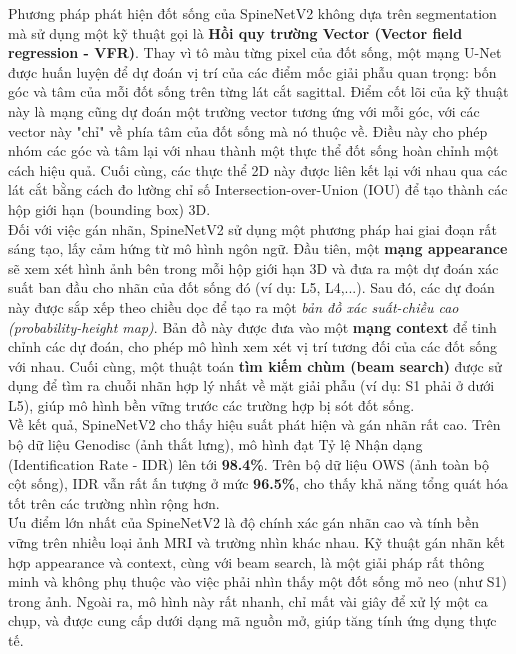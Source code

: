 Phương pháp phát hiện đốt sống của SpineNetV2 không dựa trên segmentation mà sử dụng một kỹ thuật gọi là \textbf{Hồi quy trường Vector (Vector field regression - VFR)}. Thay vì tô màu từng pixel của đốt sống, một mạng U-Net được huấn luyện để dự đoán vị trí của các điểm mốc giải phẫu quan trọng: bốn góc và tâm của mỗi đốt sống trên từng lát cắt sagittal. Điểm cốt lõi của kỹ thuật này là mạng cũng dự đoán một trường vector tương ứng với mỗi góc, với các vector này "chỉ" về phía tâm của đốt sống mà nó thuộc về. Điều này cho phép nhóm các góc và tâm lại với nhau thành một thực thể đốt sống hoàn chỉnh một cách hiệu quả. Cuối cùng, các thực thể 2D này được liên kết lại với nhau qua các lát cắt bằng cách đo lường chỉ số Intersection-over-Union (IOU) để tạo thành các hộp giới hạn (bounding box) 3D.\\

Đối với việc gán nhãn, SpineNetV2 sử dụng một phương pháp hai giai đoạn rất sáng tạo, lấy cảm hứng từ mô hình ngôn ngữ. Đầu tiên, một \textbf{mạng appearance} sẽ xem xét hình ảnh bên trong mỗi hộp giới hạn 3D và đưa ra một dự đoán xác suất ban đầu cho nhãn của đốt sống đó (ví dụ: L5, L4,...). Sau đó, các dự đoán này được sắp xếp theo chiều dọc để tạo ra một \textit{bản đồ xác suất-chiều cao (probability-height map)}. Bản đồ này được đưa vào một \textbf{mạng context} để tinh chỉnh các dự đoán, cho phép mô hình xem xét vị trí tương đối của các đốt sống với nhau. Cuối cùng, một thuật toán \textbf{tìm kiếm chùm (beam search)} được sử dụng để tìm ra chuỗi nhãn hợp lý nhất về mặt giải phẫu (ví dụ: S1 phải ở dưới L5), giúp mô hình bền vững trước các trường hợp bị sót đốt sống.\\

Về kết quả, SpineNetV2 cho thấy hiệu suất phát hiện và gán nhãn rất cao. Trên bộ dữ liệu Genodisc (ảnh thắt lưng), mô hình đạt Tỷ lệ Nhận dạng (Identification Rate - IDR) lên tới \textbf{98.4\%}. Trên bộ dữ liệu OWS (ảnh toàn bộ cột sống), IDR vẫn rất ấn tượng ở mức \textbf{96.5\%}, cho thấy khả năng tổng quát hóa tốt trên các trường nhìn rộng hơn.\\

Ưu điểm lớn nhất của SpineNetV2 là độ chính xác gán nhãn cao và tính bền vững trên nhiều loại ảnh MRI và trường nhìn khác nhau. Kỹ thuật gán nhãn kết hợp appearance và context, cùng với beam search, là một giải pháp rất thông minh và không phụ thuộc vào việc phải nhìn thấy một đốt sống mỏ neo (như S1) trong ảnh. Ngoài ra, mô hình này rất nhanh, chỉ mất vài giây để xử lý một ca chụp, và được cung cấp dưới dạng mã nguồn mở, giúp tăng tính ứng dụng thực tế.\\

